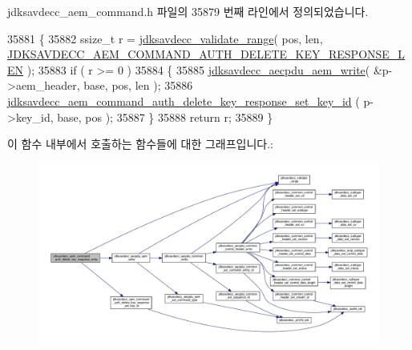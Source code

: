jdksavdecc\+\_\+aem\+\_\+command.\+h 파일의 35879 번째 라인에서 정의되었습니다.


\begin{DoxyCode}
35881 \{
35882     ssize\_t r = \hyperlink{group__util_ga9c02bdfe76c69163647c3196db7a73a1}{jdksavdecc\_validate\_range}( pos, len, 
      \hyperlink{group__command__auth__delete__key__response_gad8fec5b20fa47316ff1050b21a4574e7}{JDKSAVDECC\_AEM\_COMMAND\_AUTH\_DELETE\_KEY\_RESPONSE\_LEN} );
35883     \textcolor{keywordflow}{if} ( r >= 0 )
35884     \{
35885         \hyperlink{group__aecpdu__aem_gad658e55771cce77cecf7aae91e1dcbc5}{jdksavdecc\_aecpdu\_aem\_write}( &p->aem\_header, base, pos, len );
35886         \hyperlink{group__command__auth__delete__key__response_ga185caeb179644b1115f709aa9f5ba028}{jdksavdecc\_aem\_command\_auth\_delete\_key\_response\_set\_key\_id}
      ( p->key\_id, base, pos );
35887     \}
35888     \textcolor{keywordflow}{return} r;
35889 \}
\end{DoxyCode}


이 함수 내부에서 호출하는 함수들에 대한 그래프입니다.\+:
\nopagebreak
\begin{figure}[H]
\begin{center}
\leavevmode
\includegraphics[width=350pt]{group__command__auth__delete__key__response_gae799560cc459366c17c55c661445781f_cgraph}
\end{center}
\end{figure}


